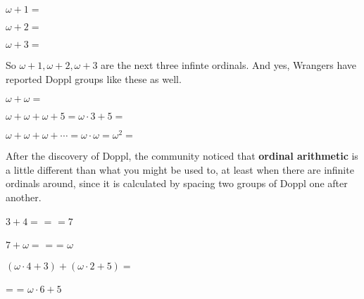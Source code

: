\(\omega+1=\) \mappDopplOmega\mappDoppl

\(\omega+2=\) \mappDopplOmega\mappDoppl\mappDoppl

\(\omega+3=\) \mappDopplOmega\mappDoppl\mappDoppl\mappDoppl

So \(\omega+1,\omega+2,\omega+3\) are the next three infinte ordinals.
And yes, Wrangers have reported Doppl groups like these as well.

\(\omega+\omega=\) \mappDopplOmega\mappDopplOmega

\(\omega+\omega+\omega+5=\omega\cdot 3 + 5=\) \mappDopplOmega\mappDopplOmega\mappDopplOmega\mappDoppl\mappDoppl\mappDoppl\mappDoppl\mappDoppl

\(\omega+\omega+\omega+\cdots=\omega\cdot\omega=\omega^2=\)
\mappDopplOmega\mappDopplOmega\mappDopplOmega\mappDopplOmega\mappDopplOmega
\mappDopplOmega\mappDopplOmega\mappDopplOmega\mappDopplOmega\mappDopplOmega
\mappDopplOmega\mappDopplOmega\mappDopplOmega\mappDopplOmega\mappDopplOmega
\mappDopplOmega\mappDopplOmega\mappDopplOmega\mappDopplOmega\mappDopplOmega
\mappDopplOmega\mappDopplOmega\mappDopplOmega\mappDopplOmega\mappDopplOmega
\mappDopplOmega\mappDopplOmega\mappDopplOmega\mappDopplOmega\mappDopplOmega
\mappDopplOmega\mappDopplOmega\mappDopplOmega\mappDopplOmega\mappDopplOmega
\mappDopplOmega\mappDopplOmega\mappDopplOmega\mappDopplOmega\mappDopplOmega


After the discovery of Doppl, the \mappMobimon{} community noticed that
\textbf{ordinal arithmetic} is a little different than what you might be used
to, at least when there are infinite ordinals around, since it is calculated
by spacing two groups of Doppl one after another.

\(3+4=\) \mappDoppl\mappDoppl\mappDoppl{}
\mappDoppl\mappDoppl\mappDoppl\mappDoppl{} =
\mappDoppl\mappDoppl\mappDoppl\mappDoppl\mappDoppl\mappDoppl\mappDoppl{}
\(=7\)

\(7+\omega=\)
\mappDoppl\mappDoppl\mappDoppl\mappDoppl\mappDoppl\mappDoppl\mappDoppl{}
\mappDopplOmega{} =
\mappDopplOmega{} =
\(\omega\)

\((\omega\cdot4+3)+(\omega\cdot2+5)=\)
\mappDopplOmega\mappDopplOmega\mappDopplOmega\mappDopplOmega\mappDoppl\mappDoppl\mappDoppl{}
\mappDopplOmega\mappDopplOmega\mappDoppl\mappDoppl\mappDoppl\mappDoppl\mappDoppl

\hspace{1.5in} =
\mappDopplOmega\mappDopplOmega\mappDopplOmega\mappDopplOmega\mappDopplOmega\mappDopplOmega\mappDoppl\mappDoppl\mappDoppl\mappDoppl\mappDoppl{} =
\(\omega\cdot6+5\)

